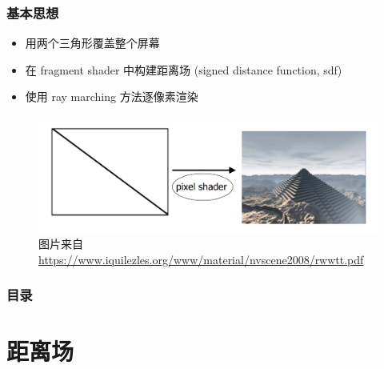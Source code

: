 \documentclass[aspectratio=169]{ctexbeamer} %
\begin{document}
\begin{frame}
    \frametitle{基本思想}
    \begin{itemize}
        \item 用两个三角形覆盖整个屏幕
        \item 在 fragment shader 中构建距离场 (signed distance function, sdf) %
        \item 使用 ray marching 方法逐像素渲染 %
    \end{itemize}
    \begin{figure}[htbp]
        \centering
        \includegraphics[height=.5\textheight]{images/pre/iq_2tri.pdf}
        \caption{\footnotesize 图片来自 \url{https://www.iquilezles.org/www/material/nvscene2008/rwwtt.pdf}}
        \label{fig:iq_2tri}
    \end{figure}
\end{frame}

\begin{frame}
    \frametitle{目录}
    \tableofcontents
\end{frame}

\section{距离场}
\end{document}
